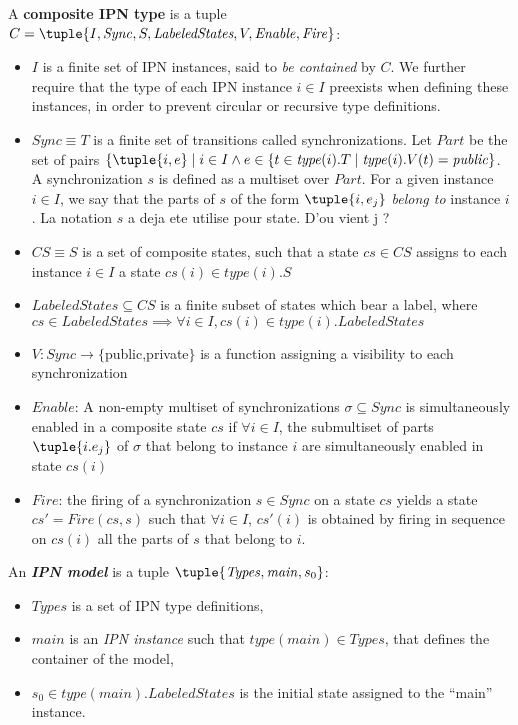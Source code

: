 A \textbf{composite IPN type} is a tuple  $C=\tuple{I,
\mathit{Sync}, S,\textit{LabeledStates},
V,\mathit{Enable},\mathit{Fire}}$:
\begin{itemize}
\item $I$ is a finite set of IPN instances, said to \emph{be contained} by $C$. We further require that the type of each IPN instance $i \in I$ preexists when defining these instances, in order to prevent circular or recursive type definitions.
\item $\mathit{Sync} \equiv T$ is a finite set of transitions called synchronizations.
Let $\mathit{Part}$ be the set of pairs $\{\tuple{i,e}\mid i \in I
\wedge e \in \{t \in \mathit{type}(i).T \mid \mathit{type}(i).V(t) =
\mathit{public}\}$. A synchronization $s$ is defined as a multiset
over $\mathit{Part}$.
 For a given instance $i \in I$, we say that the parts of $s$ of the form $\tuple{i,e_j}$ \emph{belong to} instance $i$.
{\color{red} La notation $s$ a deja ete utilise pour state. D'ou
vient j ?}
\item $CS \equiv S$ is a set of composite states, such that a state $cs \in CS$ assigns to each instance $i \in I$ a state $cs(i) \in type(i).S$
\item $\textit{LabeledStates} \subseteq CS$ is a finite subset of states which bear a label, where $cs \in \textit{LabeledStates} \implies \forall i \in I, cs(i) \in type(i).\textit{LabeledStates}$
\item $V : \mathit{Sync} \rightarrow \{$public,private$\}$ is a function assigning a visibility to each synchronization
\item $\mathit{Enable}$: A non-empty multiset of synchronizations $\sigma \subseteq \mathit{Sync}$ is simultaneously enabled in a composite state $cs$ if  $\forall i \in I$, the submultiset of parts $\tuple{i.e_j}$ of $\sigma$ that belong to instance $i$ are simultaneously enabled in state $cs(i)$
\item $\mathit{Fire}$: the firing of a synchronization $s \in \mathit{Sync}$ on a state $cs$ yields a state $cs'=\mathit{Fire}(cs,s)$ such that $\forall i \in I$, $cs'(i)$ is obtained by firing in sequence on $cs(i)$ all the parts of $s$ that belong to $i$.
\end{itemize}

An \textbf{\textit{IPN model}} is a tuple $\tuple{ \mathit{Types},
\mathit{main}, s_0}$:
\begin{itemize}
\item $\mathit{Types}$ is a set of IPN type definitions,
\item $\mathit{main}$ is an \textit{IPN instance} such that $\mathit{type(main)} \in \mathit{Types}$, that defines the container of the model,
\item $s_0 \in \mathit{type(main).LabeledStates}$ is the initial state assigned to the ``main'' instance.
\end{itemize}


